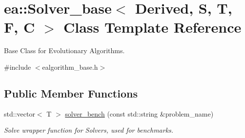 \hypertarget{classea_1_1_solver__base}{}\section{ea\+:\+:Solver\+\_\+base$<$ Derived, S, T, F, C $>$ Class Template Reference}
\label{classea_1_1_solver__base}


Base Class for Evolutionary Algorithms.  




{\ttfamily \#include $<$ealgorithm\+\_\+base.\+h$>$}

\subsection*{Public Member Functions}
\begin{DoxyCompactItemize}
\item 
std\+::vector$<$ T $>$ \hyperlink{classea_1_1_solver__base_aa5cf33a16448e3a0ea3ddb61a3573fb0}{solver\+\_\+bench} (const std\+::string \&problem\+\_\+name)
\begin{DoxyCompactList}\small\item\em Solve wrapper function for Solvers, used for benchmarks. \end{DoxyCompactList}\end{DoxyCompactItemize}
